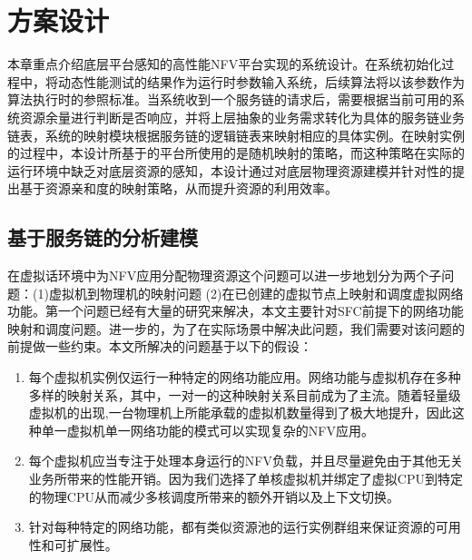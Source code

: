 \chapter{方案设计}
\label{chap:design}
本章重点介绍底层平台感知的高性能NFV平台实现的系统设计。在系统初始化过程中，将动态性能测试的结果作为运行时参数输入系统，后续算法将以该参数作为算法执行时的参照标准。当系统收到一个服务链的请求后，需要根据当前可用的系统资源余量进行判断是否响应，并将上层抽象的业务需求转化为具体的服务链业务链表，系统的映射模块根据服务链的逻辑链表来映射相应的具体实例。在映射实例的过程中，本设计所基于的平台所使用的是随机映射的策略，而这种策略在实际的运行环境中缺乏对底层资源的感知，本设计通过对底层物理资源建模并针对性的提出基于资源亲和度的映射策略，从而提升资源的利用效率。

\section{基于服务链的分析建模}
在虚拟话环境中为NFV应用分配物理资源这个问题可以进一步地划分为两个子问题：(1)虚拟机到物理机的映射问题 (2)在已创建的虚拟节点上映射和调度虚拟网络功能。第一个问题已经有大量的研究来解决，本文主要针对SFC前提下的网络功能映射和调度问题。进一步的，为了在实际场景中解决此问题，我们需要对该问题的前提做一些约束。本文所解决的问题基于以下的假设：
\begin{enumerate}
	\item 每个虚拟机实例仅运行一种特定的网络功能应用。网络功能与虚拟机存在多种多样的映射关系，其中，一对一的这种映射关系目前成为了主流。随着轻量级虚拟机的出现\cite{martins2014clickos,manco2017my},一台物理机上所能承载的虚拟机数量得到了极大地提升，因此这种单一虚拟机单一网络功能的模式可以实现复杂的NFV应用。
	\item 每个虚拟机应当专注于处理本身运行的NFV负载，并且尽量避免由于其他无关业务所带来的性能开销。因为我们选择了单核虚拟机并绑定了虚拟CPU到特定的物理CPU从而减少多核调度所带来的额外开销以及上下文切换。
	\item 针对每种特定的网络功能，都有类似资源池的运行实例群组来保证资源的可用性和可扩展性。
\end{enumerate}

